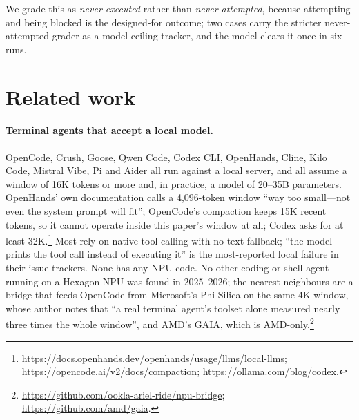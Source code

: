 \documentclass[11pt]{article}
\begin{document}
We grade this as \emph{never executed} rather than \emph{never attempted},
because attempting and being blocked is the designed-for outcome; two cases
carry the stricter never-attempted grader as a model-ceiling tracker, and
the model clears it once in six runs.

\section{Related work}

\paragraph{Terminal agents that accept a local model.} OpenCode, Crush,
Goose, Qwen Code, Codex CLI, OpenHands, Cline, Kilo Code, Mistral Vibe, Pi and
Aider all run against a local server, and all assume a window of 16K tokens
or more and, in practice, a model of 20--35B parameters. OpenHands' own
documentation calls a 4,096-token window ``way too small---not even the
system prompt will fit''; OpenCode's compaction keeps 15K recent tokens, so
it cannot operate inside this paper's window at all; Codex asks for at least
32K.\footnote{\url{https://docs.openhands.dev/openhands/usage/llms/local-llms};
\url{https://opencode.ai/v2/docs/compaction}; \url{https://ollama.com/blog/codex}.}
Most rely on native tool calling with no text fallback; ``the model prints
the tool call instead of executing it'' is the most-reported local failure in
their issue trackers. None has any NPU code. No other coding or shell agent
running on a Hexagon NPU was found in 2025--2026; the nearest neighbours are
a bridge that feeds OpenCode from Microsoft's Phi Silica on the same 4K
window, whose author notes that ``a real terminal agent's toolset alone
measured nearly three times the whole window'', and AMD's GAIA, which is
AMD-only.\footnote{\url{https://github.com/ookla-ariel-ride/npu-bridge};
\url{https://github.com/amd/gaia}.}
\end{document}
